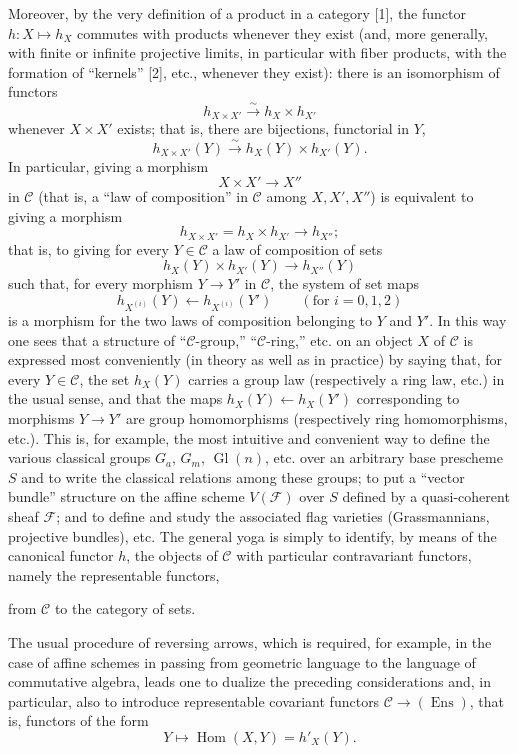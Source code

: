 Moreover, by the very definition of a product in a category [1], the functor
$h:X\longmapsto h_X$ commutes with products whenever they exist (and, more
generally, with finite or infinite projective limits, in particular with fiber
products, with the formation of “kernels” [2], etc., whenever they exist):
there is an isomorphism of functors
\[
  h_{X\times X'}\xrightarrow{\sim}h_X\times h_{X'}
\]
whenever $X\times X'$ exists; that is, there are bijections, functorial in $Y$,
\[
  h_{X\times X'}(Y)\xrightarrow{\sim}h_X(Y)\times h_{X'}(Y).
\]
In particular, giving a morphism
\[
  X\times X'\longrightarrow X''
\]
in $\mathcal C$ (that is, a “law of composition” in $\mathcal C$ among
$X,X',X''$) is equivalent to giving a morphism
\[
  h_{X\times X'}=h_X\times h_{X'}\longrightarrow h_{X''};
\]
that is, to giving for every $Y\in\mathcal C$ a law of composition of sets
\[
  h_X(Y)\times h_{X'}(Y)\longrightarrow h_{X''}(Y)
\]
such that, for every morphism $Y\longrightarrow Y'$ in $\mathcal C$, the
system of set maps
\[
  h_{X^{(i)}}(Y)\longleftarrow h_{X^{(i)}}(Y')
  \qquad(\text{for }i=0,1,2)
\]
is a morphism for the two laws of composition belonging to $Y$ and $Y'$. In
this way one sees that a structure of “$\mathcal C$-group,”
“$\mathcal C$-ring,” etc. on an object $X$ of $\mathcal C$ is expressed most
conveniently (in theory as well as in practice) by saying that, for every
$Y\in\mathcal C$, the set $h_X(Y)$ carries a group law (respectively a ring
law, etc.) in the usual sense, and that the maps
$h_X(Y)\longleftarrow h_X(Y')$ corresponding to morphisms
$Y\longrightarrow Y'$ are group homomorphisms (respectively ring
homomorphisms, etc.). This is, for example, the most intuitive and convenient
way to define the various classical groups $G_a$, $G_m$,
$\operatorname{Gl}(n)$, etc. over an arbitrary base prescheme $S$ and to write
the classical relations among these groups; to put a “vector bundle” structure
on the affine scheme $V(\mathcal F)$ over $S$ defined by a quasi-coherent
sheaf $\mathcal F$; and to define and study the associated flag varieties
(Grassmannians, projective bundles), etc. The general yoga is simply to
identify, by means of the canonical functor $h$, the objects of $\mathcal C$
with particular contravariant functors, namely the representable functors,

from $\mathcal C$ to the category of sets.

The usual procedure of reversing arrows, which is required, for example, in
the case of affine schemes in passing from geometric language to the language
of commutative algebra, leads one to dualize the preceding considerations and,
in particular, also to introduce representable covariant functors
$\mathcal C\longrightarrow(\operatorname{Ens})$, that is, functors of the
form
\[
  Y\longmapsto\operatorname{Hom}(X,Y)=h'_X(Y).
\]

